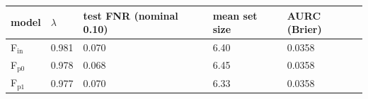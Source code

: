 \begin{tabular}{lllll}
\toprule
model & $\lambda$ & test FNR (nominal 0.10) & mean set size & AURC (Brier) \\
\midrule
F$_\mathrm{in}$ & 0.981 & 0.070 & 6.40 & 0.0358 \\
F$_\mathrm{p0}$ & 0.978 & 0.068 & 6.45 & 0.0358 \\
F$_\mathrm{p1}$ & 0.977 & 0.070 & 6.33 & 0.0358 \\
\bottomrule
\end{tabular}

